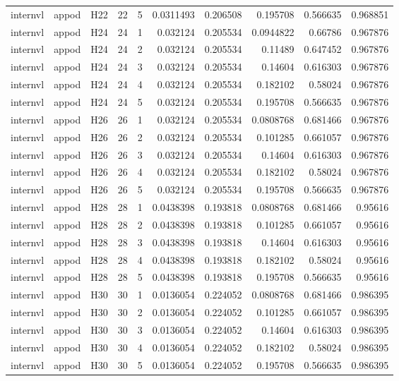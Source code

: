 \begin{longtable}{lllrrrrrrr}
internvl & appod & H22 & 22 & 5 & 0.0311493 & 0.206508 & 0.195708 & 0.566635 & 0.968851 \\
internvl & appod & H24 & 24 & 1 & 0.032124 & 0.205534 & 0.0944822 & 0.66786 & 0.967876 \\
internvl & appod & H24 & 24 & 2 & 0.032124 & 0.205534 & 0.11489 & 0.647452 & 0.967876 \\
internvl & appod & H24 & 24 & 3 & 0.032124 & 0.205534 & 0.14604 & 0.616303 & 0.967876 \\
internvl & appod & H24 & 24 & 4 & 0.032124 & 0.205534 & 0.182102 & 0.58024 & 0.967876 \\
internvl & appod & H24 & 24 & 5 & 0.032124 & 0.205534 & 0.195708 & 0.566635 & 0.967876 \\
internvl & appod & H26 & 26 & 1 & 0.032124 & 0.205534 & 0.0808768 & 0.681466 & 0.967876 \\
internvl & appod & H26 & 26 & 2 & 0.032124 & 0.205534 & 0.101285 & 0.661057 & 0.967876 \\
internvl & appod & H26 & 26 & 3 & 0.032124 & 0.205534 & 0.14604 & 0.616303 & 0.967876 \\
internvl & appod & H26 & 26 & 4 & 0.032124 & 0.205534 & 0.182102 & 0.58024 & 0.967876 \\
internvl & appod & H26 & 26 & 5 & 0.032124 & 0.205534 & 0.195708 & 0.566635 & 0.967876 \\
internvl & appod & H28 & 28 & 1 & 0.0438398 & 0.193818 & 0.0808768 & 0.681466 & 0.95616 \\
internvl & appod & H28 & 28 & 2 & 0.0438398 & 0.193818 & 0.101285 & 0.661057 & 0.95616 \\
internvl & appod & H28 & 28 & 3 & 0.0438398 & 0.193818 & 0.14604 & 0.616303 & 0.95616 \\
internvl & appod & H28 & 28 & 4 & 0.0438398 & 0.193818 & 0.182102 & 0.58024 & 0.95616 \\
internvl & appod & H28 & 28 & 5 & 0.0438398 & 0.193818 & 0.195708 & 0.566635 & 0.95616 \\
internvl & appod & H30 & 30 & 1 & 0.0136054 & 0.224052 & 0.0808768 & 0.681466 & 0.986395 \\
internvl & appod & H30 & 30 & 2 & 0.0136054 & 0.224052 & 0.101285 & 0.661057 & 0.986395 \\
internvl & appod & H30 & 30 & 3 & 0.0136054 & 0.224052 & 0.14604 & 0.616303 & 0.986395 \\
internvl & appod & H30 & 30 & 4 & 0.0136054 & 0.224052 & 0.182102 & 0.58024 & 0.986395 \\
internvl & appod & H30 & 30 & 5 & 0.0136054 & 0.224052 & 0.195708 & 0.566635 & 0.986395 \\

\end{longtable}
